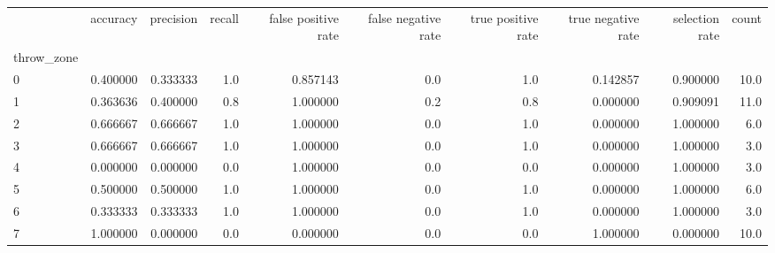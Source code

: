 \begin{tabular}{lrrrrrrrrr}
\toprule
{} &  accuracy &  precision &  recall &  false positive rate &  false negative rate &  true positive rate &  true negative rate &  selection rate &  count \\
throw\_zone &           &            &         &                      &                      &                     &                     &                 &        \\
\midrule
0          &  0.400000 &   0.333333 &     1.0 &             0.857143 &                  0.0 &                 1.0 &            0.142857 &        0.900000 &   10.0 \\
1          &  0.363636 &   0.400000 &     0.8 &             1.000000 &                  0.2 &                 0.8 &            0.000000 &        0.909091 &   11.0 \\
2          &  0.666667 &   0.666667 &     1.0 &             1.000000 &                  0.0 &                 1.0 &            0.000000 &        1.000000 &    6.0 \\
3          &  0.666667 &   0.666667 &     1.0 &             1.000000 &                  0.0 &                 1.0 &            0.000000 &        1.000000 &    3.0 \\
4          &  0.000000 &   0.000000 &     0.0 &             1.000000 &                  0.0 &                 0.0 &            0.000000 &        1.000000 &    3.0 \\
5          &  0.500000 &   0.500000 &     1.0 &             1.000000 &                  0.0 &                 1.0 &            0.000000 &        1.000000 &    6.0 \\
6          &  0.333333 &   0.333333 &     1.0 &             1.000000 &                  0.0 &                 1.0 &            0.000000 &        1.000000 &    3.0 \\
7          &  1.000000 &   0.000000 &     0.0 &             0.000000 &                  0.0 &                 0.0 &            1.000000 &        0.000000 &   10.0 \\
\bottomrule
\end{tabular}
